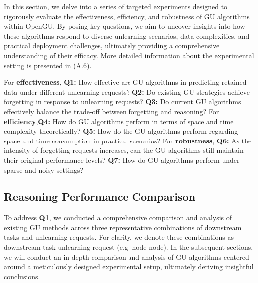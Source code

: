 

In this section, we delve into a series of targeted experiments designed to rigorously evaluate the effectiveness, efficiency, and robustness of GU algorithms within OpenGU. By posing key questions, we aim to uncover insights into how these algorithms respond to diverse unlearning scenarios, data complexities, and practical deployment challenges, ultimately providing a comprehensive understanding of their efficacy. More detailed information about the experimental setting is presented in \cite{OpenGU2025} (A.6).

For \textbf{effectiveness}, \textbf{Q1:} How effective are GU algorithms in predicting retained data under different unlearning requests? \textbf{Q2:} Do existing GU strategies achieve forgetting in response to unlearning requests? \textbf{Q3:} Do current GU algorithms effectively balance the trade-off between forgetting and reasoning? For \textbf{efficiency},\textbf{Q4:} How do GU algorithms perform in terms of space and time complexity theoretically? \textbf{Q5:} How do the GU algorithms perform regarding space and time consumption in practical scenarios? For \textbf{robustness}, \textbf{Q6:} As the intensity of forgetting requests increases, can the GU algorithms still maintain their original performance levels? \textbf{Q7:} How do GU algorithms perform under sparse and noisy settings?






\subsection{Reasoning Performance Comparison}
To address \textbf{Q1}, we conducted a comprehensive comparison and analysis of existing GU methods across three representative combinations of downstream tasks and unlearning requests.
For clarity, we denote these combinations as downstream task-unlearning request (e.g. node-node). In the subsequent sections, we will conduct an in-depth comparison and analysis of GU algorithms centered around a meticulously designed experimental setup, ultimately deriving insightful conclusions.




